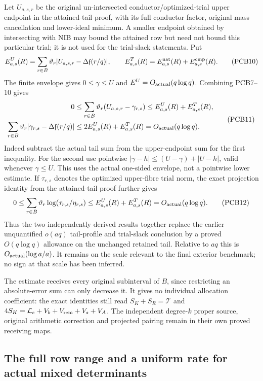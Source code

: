 \documentclass[11pt,a4paper]{article}
\begin{document}
Let $U_{a,s,r}$ be the original un-intersected conductor/optimized-trial
upper endpoint in the attained-tail proof, with its full conductor factor,
original mass cancellation and lower-ideal minimum. A smaller endpoint
obtained by intersecting with NIB may bound the attained row but need not
bound this particular trial; it is not used for the trial-slack statements.
Put
\[
 E^U_{a,s}(R)=\sum_{r\in B}\vartheta_r
       |U_{a,s,r}-\Delta\mathfrak f(r/q)|,
 \qquad E^T_{a,s}(R)=E^{\rm nat}_{a,s}(R)+E^{\rm cmp}_{a,s}(R).
 \tag{PCB10}
\]
The finite envelope gives $0\le\gamma\le U$ and
$E^U=O_{\rm actual}(q\log q)$. Combining PCB7--10 gives
\[
 \begin{split}
 0&\le\sum_{r\in B}\vartheta_r(U_{a,s,r}-\gamma_{r,s})
       \le E^U_{a,s}(R)+E^T_{a,s}(R),\\
 \sum_{r\in B}\vartheta_r
       |\gamma_{r,s}-\Delta\mathfrak f(r/q)|
       &\le2E^U_{a,s}(R)+E^T_{a,s}(R)
        =O_{\rm actual}(q\log q).
 \end{split}\tag{PCB11}
\]
Indeed subtract the actual tail sum from the upper-endpoint sum for the
first inequality. For the second use pointwise
$|\gamma-h|\le(U-\gamma)+|U-h|$, valid whenever $\gamma\le U$.
This uses the actual one-sided envelope, not a pointwise lower estimate.
If $\tau_{r,s}$ denotes the optimized upper-fibre trial norm, the exact
projection identity from the attained-tail proof further gives
\[
 0\le\sum_{r\in B}\vartheta_r\log(\tau_{r,s}/\eta_{r,s})
       \le E^U_{a,s}(R)+E^T_{a,s}(R)
       =O_{\rm actual}(q\log q).
 \tag{PCB12}
\]
Thus the two independently derived results together replace the earlier
unquantified $o(aq)$ tail-profile and trial-slack conclusion by a proved
$O(q\log q)$ allowance on the unchanged retained tail. Relative to $aq$
this is $O_{\rm actual}(\log a/a)$. It remains on the scale relevant to
the final exterior benchmark; no sign at that scale has been inferred.

The estimate receives every original subinterval of $B$, since restricting
an absolute-error sum can only decrease it. It gives no individual
allocation coefficient: the exact identities still read
$S_K+S_R=\mathcal T$ and
$4S_K=\mathcal L_e+V_b+V_{\rm rem}+V_s+V_A$.
The independent degree-$k$ proper source, original arithmetic correction
and projected pairing remain in their own proved receiving maps.

\subsection{The full row range and a uniform rate for actual mixed determinants}
\end{document}

